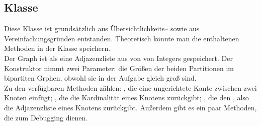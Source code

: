 \subsection{Klasse }
Diese Klasse ist grundsätzlich aus Übersichtlichkeits-- sowie aus Vereinfachungsgründen
entstanden. Theoretisch könnte man die enthaltenen Methoden in der Klasse  
speichern.\\

Der Graph ist als eine Adjazenzliste aus  von  von Integers gespeichert.
Der Konstruktor nimmt zwei Parameter: die Größen der beiden Partitionen
im bipartiten Grphen, obwohl sie in der Aufgabe gleich groß sind.\\

Zu den verfügbaren Methoden zählen: ,
die eine ungerichtete Kante zwischen zwei Knoten einfügt; , die die Kardinalität
eines Knotens zurückgibt; , die den , also die Adjazenzliste
eines Knotens zurückgibt. Außerdem gibt es ein paar Methoden, die zum Debugging dienen. 

